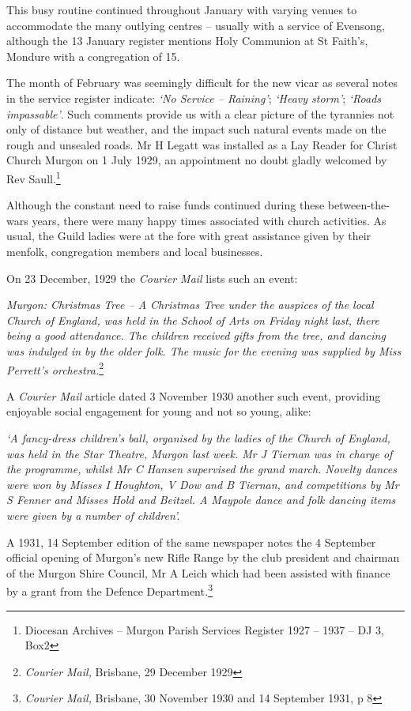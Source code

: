 This busy routine continued throughout January with varying venues to accommodate the many outlying centres -- usually with a service of Evensong, although the 13 January register mentions Holy Communion at St Faith's, Mondure with a congregation of 15.

The month of February was seemingly difficult for the new vicar as several notes in the service register indicate: \emph{`No Service -- Raining'}; \emph{`Heavy storm'}; \emph{`Roads impassable'}. Such comments provide us with a clear picture of the tyrannies not only of distance but weather, and the impact such natural events made on the rough and unsealed roads. Mr H Legatt was installed as a Lay Reader for Christ Church Murgon on 1 July 1929, an appointment no doubt gladly welcomed by Rev Saull.\footnote{Diocesan Archives -- Murgon Parish Services Register 1927 -- 1937 -- DJ 3, Box2}

Although the constant need to raise funds continued during these between-the-wars years, there were many happy times associated with church activities. As usual, the Guild ladies were at the fore with great assistance given by their menfolk, congregation members and local businesses.

On 23 December, 1929 the \emph{Courier Mail} lists such an event:

\emph{Murgon: Christmas Tree -- A Christmas Tree under the auspices of the local Church of England, was held in the School of Arts on Friday night last, there being a good attendance. The children received gifts from the tree, and dancing was indulged in by the older folk. The music for the evening was supplied by Miss Perrett's orchestra.}\footnote{\emph{Courier Mail,} Brisbane, 29 December 1929}

A \emph{Courier Mail} article dated 3 November 1930 another such event, providing enjoyable social engagement for young and not so young, alike:

\emph{`A fancy-dress children's ball, organised by the ladies of the Church of England, was held in the Star Theatre, Murgon last week. Mr J Tiernan was in charge of the programme, whilst Mr C Hansen supervised the grand march. Novelty dances were won by Misses I Houghton, V Dow and B Tiernan, and competitions by Mr S Fenner and Misses Hold and Beitzel. A Maypole dance and folk dancing items were given by a number of children'.}

A 1931, 14 September edition of the same newspaper notes the 4 September official opening of Murgon's new Rifle Range by the club president and chairman of the Murgon Shire Council, Mr A Leich which had been assisted with finance by a grant from the Defence Department\emph{.}\footnote{\emph{Courier Mail,} Brisbane, 30 November 1930 and 14 September 1931, p 8}

